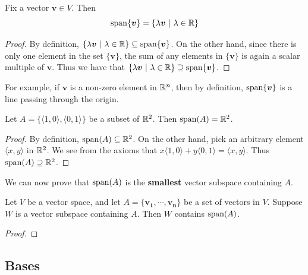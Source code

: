     \begin{example}
    \begin{proposition}
        Fix a vector $\bm{v} \in V$.  Then $$\textnormal{span}\{\bm{v}\} = \{ \lambda \bm{v} \ | \ \lambda \in \mathbb{R}\}$$
    \end{proposition}
    
    \begin{proof}
    By definition, $\{ \lambda \bm{v} \ | \ \lambda \in \mathbb{R}\} \subseteq \textnormal{span}\{\bm{v}\}$.  On the other hand, since there is only one element in the set $\{\bm{v}\}$, the sum of any elements in $\{\bm{v}\}$ is again a scalar multiple of $\bm{v}$.  Thus we have that $\{ \lambda \bm{v} \ | \ \lambda \in \R\} \supseteq \textnormal{span}\{\bm{v}\}$.
    \end{proof}
    
    
    For example, if $\bm{v}$ is a non-zero element in $\mathbb{R}^n$, then by definition, $\textnormal{span}\{\bm{v}\}$ is a line passing through the origin.
    \end{example}
    
    \begin{example}
    Let $A = \{\langle 1,0 \rangle, \langle 0,1\rangle \}$ be a subset of $\mathbb{R}^2$.  Then $\textnormal{span}(A) = \mathbb{R}^2$.
    
    \begin{proof}
    By definition, $\textnormal{span}(A) \subseteq \mathbb{R}^2$.  On the other hand, pick an arbitrary element $\langle x, y \rangle$ in $\mathbb{R}^2$. We see from the axioms that $x\langle 1,0 \rangle + y\langle 0,1 \rangle = \langle x, y \rangle$.  Thus $\textnormal{span}(A) \supseteq \mathbb{R}^2$.
    \end{proof}
    \end{example}
    
    
    We can now prove that $\textnormal{span}(A)$ is the \textbf{smallest} vector subspace containing $A$.  
    
    \begin{theorem}
    Let $V$ be a vector space, and let $A = \{\bm{v_1}, \cdots, \bm{v_n}\}$ be a set of vectors in $V$.  Suppose $W$ is a vector subspace containing $A$.  Then $W$ contains $\textnormal{span}(A)$.
    \end{theorem}
    
    \begin{proof}
    
    \end{proof}
    
    \subsection{Bases}
    
